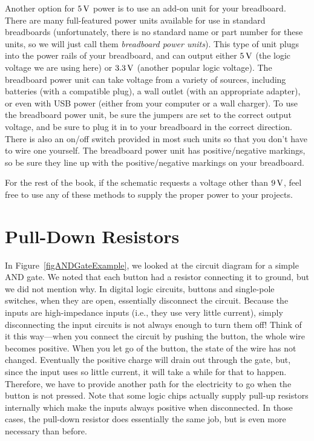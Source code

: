 Another option for $5\,\si{\volt}$ power is to use an add-on unit for your breadboard.
There are many full-featured power units available for use in standard breadboards (unfortunately, there is no standard name or part number for these units, so we will just call them \emph{breadboard power units}).
This type of unit plugs into the power rails of your breadboard, and can output either $5\,\si{\volt}$ (the logic voltage we are using here) or $3.3\,\si{\volt}$ (another popular logic voltage).
The breadboard power unit can take voltage from a variety of sources, including batteries (with a compatible plug), a wall outlet (with an appropriate adapter), or even with USB power (either from your computer or a wall charger).
To use the breadboard power unit, be sure the jumpers are set to the correct output voltage, and be sure to plug it in to your breadboard in the correct direction.  
There is also an on/off switch provided in most such units so that you don't have to wire one yourself.
The breadboard power unit has positive/negative markings, so be sure they line up with the positive/negative markings on your breadboard.


For the rest of the book, if the schematic requests a voltage other than $9\,\si{\volt}$, feel free to use any of these methods to supply the proper power to your projects.

\section{Pull-Down Resistors}
\label{secPullDownResistors}

In Figure~\ref{figANDGateExample}, we looked at the circuit diagram for a simple AND gate.  
We noted that each button had a resistor connecting it to ground, but we did not mention why.
In digital logic circuits, buttons and single-pole switches, when they are open, essentially disconnect the circuit.
Because the inputs are high-impedance inputs (i.e., they use very little current), simply disconnecting the input circuits is not always enough to turn them off!
Think of it this way---when you connect the circuit by pushing the button, the whole wire becomes positive.
When you let go of the button, the state of the wire has not changed.
Eventually the positive charge will drain out through the gate, but, since the input uses so little current, it will take a while for that to happen.
Therefore, we have to provide another path for the electricity to go when the button is not pressed.
Note that some logic chips actually supply pull-up resistors internally which make the inputs always positive when disconnected.  
In those cases, the pull-down resistor does essentially the same job, but is even more necessary than before.

